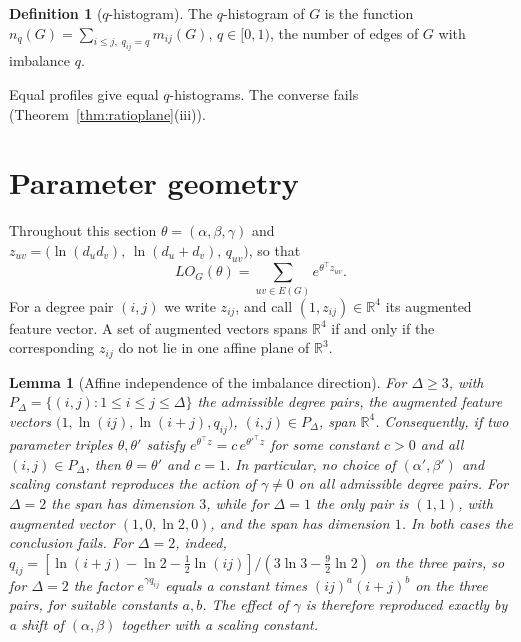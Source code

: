 \documentclass[a5paper, 10pt]{article}
\theoremstyle{plain}
\newtheorem{lemma}{Lemma}
\theoremstyle{remark}
\theoremstyle{definition}
\newtheorem{definition}{Definition}
\begin{document}
\begin{definition}[$q$-histogram]\label{def:qhist}
The $q$-histogram of $G$ is the function
$n_q(G) = \sum_{i \le j,\; q_{ij} = q} m_{ij}(G)$, $q \in [0,1)$,
the number of edges of $G$ with imbalance $q$.
\end{definition}

Equal profiles give equal $q$-histograms. The converse fails
(Theorem~\ref{thm:ratioplane}(iii)).

  \section{Parameter geometry}\label{sec:geometry}

  Throughout this section $\theta = (\alpha, \beta, \gamma)$ and
  $z_{uv} = \bigl(\ln(d_u d_v),\, \ln(d_u + d_v),\, q_{uv}\bigr)$, so that
  \begin{equation}\label{eq:expfamily}
  LO_G(\theta) = \sum_{uv \in E(G)} e^{\theta^{\top} z_{uv}} .
  \end{equation}
  For a degree pair $(i,j)$ we write $z_{ij}$, and call
  $(1, z_{ij}) \in \mathbb{R}^4$ its augmented feature vector. A set of
  augmented vectors spans $\mathbb{R}^4$ if and only if the
  corresponding $z_{ij}$ do not lie in one affine plane of
  $\mathbb{R}^3$.

  \begin{lemma}[Affine independence of the imbalance direction]\label{prop:indep}
  For $\Delta \ge 3$, with
  $P_{\Delta} = \{(i,j) : 1 \le i \le j \le \Delta\}$ the
  admissible degree pairs, the augmented feature vectors
  $\bigl(1, \ln(ij), \ln(i+j), q_{ij}\bigr)$, $(i,j) \in P_{\Delta}$,
  span $\mathbb{R}^4$. Consequently, if two parameter triples
  $\theta, \theta'$ satisfy
  $e^{\theta^{\top} z} = c\, e^{\theta'^{\top} z}$ for some constant
  $c > 0$ and all $(i,j) \in P_{\Delta}$, then $\theta = \theta'$ and
  $c = 1$. In particular, no choice of $(\alpha', \beta')$ and scaling
  constant reproduces the action of $\gamma \neq 0$ on all admissible
  degree pairs. For $\Delta = 2$ the span has dimension $3$, while for
  $\Delta = 1$ the only pair is $(1,1)$, with augmented vector
  $(1, 0, \ln 2, 0)$, and the span has dimension $1$. In both cases the conclusion fails. For $\Delta = 2$, indeed, $q_{ij} = [\ln(i+j) - \ln 2 - \tfrac12 \ln(ij)]/(3\ln 3 - \tfrac92 \ln 2)$ on the three pairs, so for $\Delta = 2$ the factor $e^{\gamma q_{ij}}$ equals a constant times $(ij)^{a}(i+j)^{b}$ on the three pairs, for suitable constants $a, b$. The effect of $\gamma$ is therefore reproduced exactly by a shift of $(\alpha,\beta)$ together with a scaling constant.
  \end{lemma}
\end{document}
